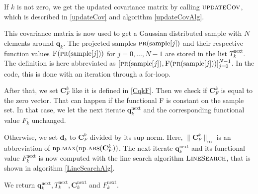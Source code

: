 If $k$ is not zero, we get the updated covariance matrix by calling $\textproc{updateCov}$, which is described in \eqref{updateCov} and algorithm \ref{updateCovAlg}.

This covariance matrix is now used to get a Gaussian distributed sample with $N$ elements around $\mathbf{q}_k$. The projected samples $\Call{pr}{\mathrm{sample}[j]}$ and their respective function values $\Call{F}{\protect\Call{pr}{\mathrm{sample}[j]}}$ for $j=0,\dotsc,N-1$ are stored in the list $T^\mathrm{next}_k$. The definition is here abbreviated as $[\Call{pr}{\mathrm{sample}[j]},\Call{F}{\protect\Call{pr}{\mathrm{sample}[j]}}]_{j=0}^{N-1}$. In the code, this is done with an iteration through a for-loop.

After that, we set $\mathbf{C}^k_F$ like it is defined in \eqref{CqkF}. Then we check if $\mathbf{C}^k_F$ is equal to the zero vector. That can happen if the functional F is constant on the sample set. In that case, we let the next iterate $\mathbf{q}^\mathrm{next}_k$ and the corresponding functional value $F_k$ unchanged.

Otherwise, we set $\mathbf{d}_k$ to $\mathbf{C}^k_F$ divided by its sup norm. Here, $\|\mathbf{C}^k_F\|_\infty$ is an abbreviation of $\mathrm{np.}\Call{max}{\mathrm{np.}\protect\Call{abs}{\mathbf{C}^k_F}}$. The next iterate $\mathbf{q}^\mathrm{next}_{k}$ and its functional value $F^\mathrm{next}_k$ is now computed with the line search algorithm $\textproc{LineSearch}$, that is shown in algorithm \ref{LineSearchAlg}.

We return $\mathbf{q}^\mathrm{next}_k,T^\mathrm{next}_k,\mathbf{C}^\mathrm{next}_k$ and $F^\mathrm{next}_k$.


